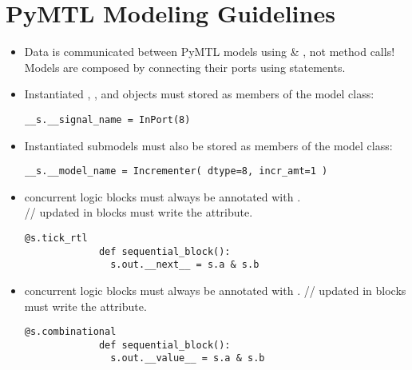 \documentclass{cbxdoc}
\begin{document}
\section{PyMTL Modeling Guidelines}
\begin{itemize} %
  \item Data is communicated between PyMTL models using  \&
         , not method calls!\\
         Models are composed  by connecting their ports
         using  statements.
  \item Instantiated , , and  objects must
         stored as members of the model class:
           \begin{lstlisting}[style=simple,gobble=10]
             __s.__signal_name = InPort(8) \end{lstlisting}%
  \item Instantiated submodels must also be stored as members of the model
         class:
           \begin{lstlisting}[style=simple,gobble=10]
             __s.__model_name = Incrementer( dtype=8, incr_amt=1 )\end{lstlisting}%
  \item {} concurrent logic blocks must always be annotated
         with . \\
        // updated in 
         blocks must write the \underline{} attribute.
           \begin{lstlisting}[style=simple,gobble=10]
             @s.tick_rtl
             def sequential_block():
               s.out.__next__ = s.a & s.b \end{lstlisting}%
  \item {} concurrent logic blocks must always be
         annotated with .
        // updated in 
         blocks must write the \underline{} attribute.
           \begin{lstlisting}[style=simple,gobble=10]
             @s.combinational
             def sequential_block():
               s.out.__value__ = s.a & s.b \end{lstlisting}%
\end{itemize}


\end{document}
